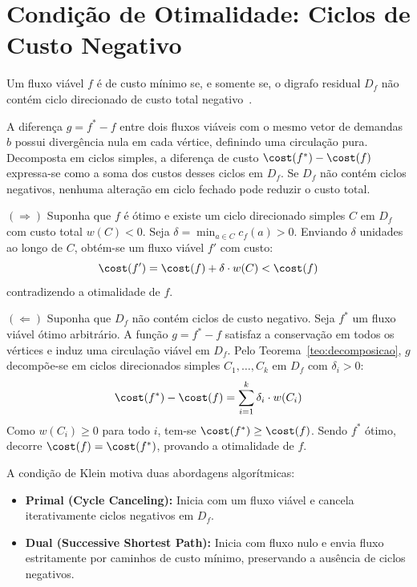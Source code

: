 \section{Condição de Otimalidade: Ciclos de Custo Negativo}\label{sec:condicao_klein}

\begin{teorema}
Um fluxo viável $f$ é de custo mínimo se, e somente se, o digrafo residual $D_f$ não contém ciclo direcionado de custo total negativo~\cite{klein1967primal}.
\end{teorema}

 A diferença $g = f^* - f$ entre dois fluxos viáveis com o mesmo vetor de demandas $b$ possui divergência nula em cada vértice, definindo uma circulação pura. Decomposta em ciclos simples, a diferença de custo $\cost(f^*) - \cost(f)$ expressa-se como a soma dos custos desses ciclos em $D_f$. Se $D_f$ não contém ciclos negativos, nenhuma alteração em ciclo fechado pode reduzir o custo total.

\begin{demonstracao}
$(\Rightarrow)$ Suponha que $f$ é ótimo e existe um ciclo direcionado simples $C$ em $D_f$ com custo total $w(C) < 0$. Seja $\delta = \min_{a \in C} c_f(a) > 0$. Enviando $\delta$ unidades ao longo de $C$, obtém-se um fluxo viável $f'$ com custo:
$$\cost(f') = \cost(f) + \delta \cdot w(C) < \cost(f)$$
contradizendo a otimalidade de $f$.

\medskip
\noindent $(\Leftarrow)$ Suponha que $D_f$ não contém ciclos de custo negativo. Seja $f^*$ um fluxo viável ótimo arbitrário. A função $g = f^* - f$ satisfaz a conservação em todos os vértices e induz uma circulação viável em $D_f$. Pelo Teorema~\ref{teo:decomposicao}, $g$ decompõe-se em ciclos direcionados simples $C_1, \ldots, C_k$ em $D_f$ com $\delta_i > 0$:
$$\cost(f^*) - \cost(f) = \sum_{i=1}^k \delta_i \cdot w(C_i)$$
Como $w(C_i) \ge 0$ para todo $i$, tem-se $\cost(f^*) \ge \cost(f)$. Sendo $f^*$ ótimo, decorre $\cost(f) = \cost(f^*)$, provando a otimalidade de $f$.
\end{demonstracao}

A condição de Klein motiva duas abordagens algorítmicas:
\begin{itemize}
    \item \textbf{Primal (Cycle Canceling):} Inicia com um fluxo viável e cancela iterativamente ciclos negativos em $D_f$.
    \item \textbf{Dual (Successive Shortest Path):} Inicia com fluxo nulo e envia fluxo estritamente por caminhos de custo mínimo, preservando a ausência de ciclos negativos.
\end{itemize}

